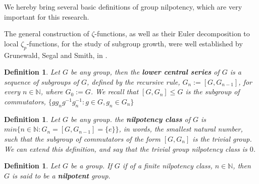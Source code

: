 \documentclass[12pt]{article}
\newtheorem{definition}[theorem]{Definition}
\begin{document}
We hereby bring several basic definitions of group nilpotency, which are very important for this research.\par
The general construction of $\zeta$-functions, as well as their Euler decomposition to local $\zeta_p$-functions, for the study of subgroup growth, were well established by Grunewald, Segal and Smith, in \cite{GrunewaldSegalSmith}.
\begin{definition}
\label{def.lower.central.series}
Let $G$ be any group, then the \textbf{lower central series} of $G$ is a sequence of subgroups of $G$, defined by the recursive rule, $G_n:=[G,G_{n-1}]$, for every $n\in\mathbb{N}$, where $G_0:=G$.  We recall that $[G,G_n]\leq G$ is the subgroup of commutators, $\{gg_ng^{-1}g_n^{-1} : g\in G,g_n\in G_n\}$
\end{definition}
\begin{definition}
\label{def.nilpotency.class}
Let $G$ be any group. the \textbf{nilpotency class} of $G$ is $min\{n\in\mathbb{N} : G_n=[G,G_{n-1}]=\{e\}\}$, in words, the smallest natural number, such that the subgroup of commutators of the form $[G,G_n]$ is the trivial group. We can extend this definition, and say that the trivial group nilpotency class is $0$.
\end{definition}
\begin{definition}
\label{def.nilpotency.class}
Let $G$ be a group. If $G$ if of a finite nilpotency class, $n\in\mathbb{N}$, then $G$ is said to be a \textbf{nilpotent} group.
\end{definition}
\end{document}
